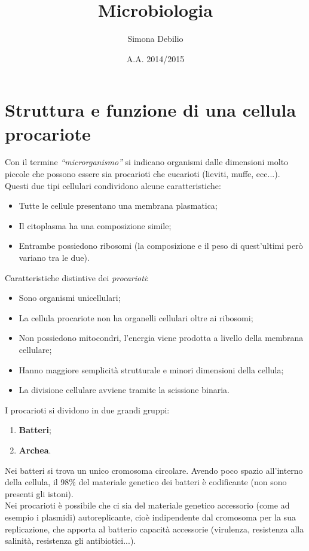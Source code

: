 \documentclass[11pt]{book}
\title{\textbf{Microbiologia}}
\author{Simona Debilio}
\date{A.A. 2014/2015}
\begin{document}
\maketitle

\tableofcontents

\chapter{Struttura e funzione di una cellula procariote}

Con il termine \emph{``microrganismo''} si indicano organismi dalle dimensioni molto piccole che possono essere sia procarioti che eucarioti (lieviti, muffe, ecc...).
Questi due tipi cellulari condividono alcune caratteristiche:
\begin{itemize}
\item Tutte le cellule presentano una membrana plasmatica;
\item Il citoplasma ha una composizione simile;
\item Entrambe possiedono ribosomi (la composizione e il peso di quest'ultimi però variano tra le due).
\end{itemize}
\vspace{1em}
Caratteristiche distintive dei \emph{procarioti}:
\begin{itemize}
\item Sono organismi unicellulari;
\item La cellula procariote non ha organelli cellulari oltre ai ribosomi;
\item Non possiedono mitocondri, l'energia viene prodotta a livello della membrana cellulare;
\item Hanno maggiore semplicità strutturale e minori dimensioni della cellula;
\item La divisione cellulare avviene tramite la scissione binaria.
\end{itemize} 
\vspace{1em}
I procarioti si dividono in due grandi gruppi:
\begin{enumerate}
\item \textbf{Batteri};
\item \textbf{Archea}.
\end{enumerate}
\vspace{1em}
Nei batteri si trova un unico cromosoma circolare.
Avendo poco spazio all'interno della cellula, il 98$\%$  del materiale genetico dei batteri è codificante (non sono presenti gli istoni).
\\Nei procarioti è possibile che ci sia del materiale genetico accessorio (come ad esempio i plasmidi) autoreplicante, cioè indipendente dal cromosoma per la sua replicazione, che apporta al batterio capacità accessorie (virulenza, resistenza alla salinità, resistenza gli antibiotici...).\\
\end{document}
